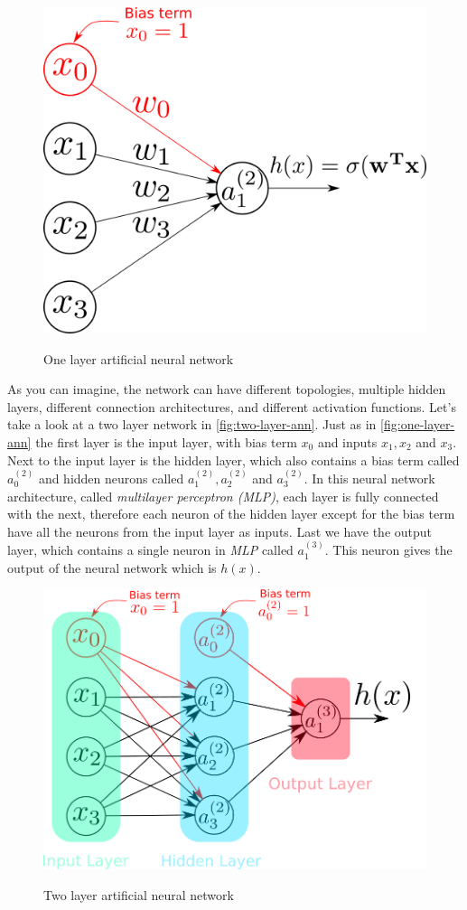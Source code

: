 \begin{figure}[bth]
  \myfloatalign
  {\includegraphics[width=.4\linewidth]
    {gfx/simple-ann-model}}
  \caption{One layer artificial neural network}
  \label{fig:one-layer-ann}
\end{figure}

As you can imagine, the network can have different topologies,
multiple hidden layers, different connection architectures, and
different activation functions. Let's take a look at a two layer
network in \autoref{fig:two-layer-ann}. Just as in
\autoref{fig:one-layer-ann} the first layer is the input layer, with
bias term $x_0$ and inputs $x_1, x_2$ and $x_3$. Next to the input
layer is the hidden layer, which also contains a bias term called
$a_0^{(2)}$ and hidden neurons called $a_1^{(2)}, a_2^{(2)}$ and
$a_3^{(2)}$. In this neural network architecture, called
\textit{multilayer perceptron (MLP)}, each layer is fully connected
with the next, therefore each neuron of the hidden layer except for
the bias term have all the neurons from the input layer as inputs.
Last we have the output layer, which contains a single neuron in
\textit{MLP} called $a_1^{(3)}$. This neuron gives the output of the
neural network which is $h(x)$.

\begin{figure}[bth]
  \myfloatalign
  {\includegraphics[width=.6\linewidth]
    {gfx/two-layer-ann-model}}
  \caption{Two layer artificial neural network}
  \label{fig:two-layer-ann}
\end{figure}

